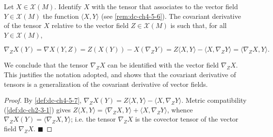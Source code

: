 \begin{example}
  \label{ex:dc-ch4-5-9}
  \leanok
  Let $X\in\mathcal{X}(M)$. Identify $X$ with the tensor that associates to the
  vector field $Y\in\mathcal{X}(M)$ the function $\langle X,Y\rangle$ (see \cref{rem:dc-ch4-5-6}). The covariant derivative of the tensor $X$ relative to the vector field
  $Z\in\mathcal{X}(M)$ is such that, for all $Y\in\mathcal{X}(M)$,

  $$
  \nabla_Z X(Y)=\nabla X(Y,Z)=Z(X(Y))-X(\nabla_Z Y)=Z\langle X,Y\rangle-\langle X,\nabla_Z Y\rangle=\langle\nabla_Z X,Y\rangle.
  $$

  We conclude that the tensor $\nabla_Z X$ can be identified with the vector field
  $\nabla_Z X$. This justifies the notation adopted, and shows that the covariant
  derivative of tensors is a generalization of the covariant derivative of vector
  fields.
\end{example}
\begin{proof}
  \leanok
  \sketch
  By \cref{def:dc-ch4-5-7}, $\nabla_Z X(Y)=Z\langle X,Y\rangle-\langle X,\nabla_Z Y\rangle$.
  Metric compatibility (\cref{def:dc-ch2-3-1}) gives $Z\langle X,Y\rangle
  =\langle\nabla_Z X,Y\rangle+\langle X,\nabla_Z Y\rangle$, whence
  $\nabla_Z X(Y)=\langle\nabla_Z X,Y\rangle$; i.e. the tensor $\nabla_Z X$ is the
  covector tensor of the vector field $\nabla_Z X$. $\blacksquare$
\end{proof}
